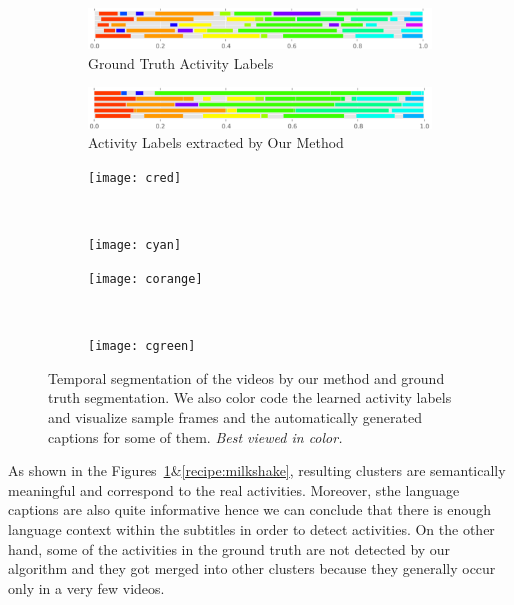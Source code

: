 \begin{figure}

\begin{subfigure}[b]{0.5\textwidth}
\includegraphics[width=\textwidth]{act_gt_2}
\caption{Ground Truth Activity Labels}
\end{subfigure}

\begin{subfigure}[b]{0.5\textwidth}
\includegraphics[width=\textwidth]{act_our_2}
\caption{Activity Labels extracted by Our Method}
\end{subfigure}

\begin{subfigure}[b]{0.25\textwidth}
\texttt{[image: cred]}
\color[HTML]{FF3800}{Crack the eggs one at a time into a bowl.}
\end{subfigure}~
\begin{subfigure}[b]{0.25\textwidth}
\texttt{[image: cyan]}
\color[HTML]{00FFED}{Remove the omelette onto a plate.}
\end{subfigure}


\begin{subfigure}[b]{0.25\textwidth}
\texttt{[image: corange]}
\color[HTML]{FF9900}{You can either use a fork or wire whisk to beat the eggs into a bowl.}
\end{subfigure}~
\begin{subfigure}[b]{0.25\textwidth}
\texttt{[image: cgreen]}
\color[HTML]{9DFF00}{Eggs cook quickly, so make sure the pan gets very hot first; the butter melt completely.}
\end{subfigure}
\caption{Temporal segmentation of the videos by our method and ground truth segmentation. We also color code the learned activity labels and visualize sample frames and the automatically generated captions for some of them. \emph{Best viewed in color.}}
\label{recipe:ommelette}
\end{figure}

As shown in the Figures~\ref{recipe:ommelette}\&\ref{recipe:milkshake}, resulting clusters are semantically meaningful and correspond to the real activities. Moreover, sthe language captions are also quite informative hence we can conclude that there is enough language context within the subtitles in order to detect activities. On the other hand, some of the activities in the ground truth are not detected by our algorithm and they got merged into other clusters because they generally occur only in a very few videos.
